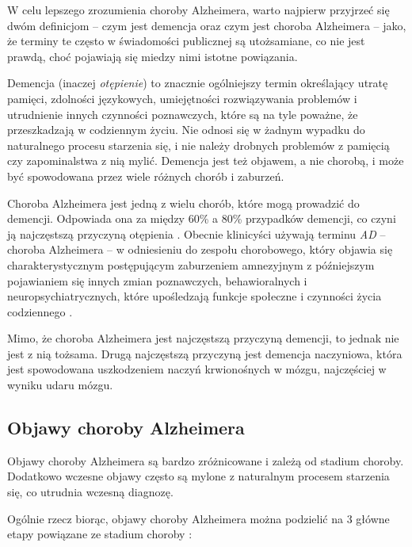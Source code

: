 W celu lepszego zrozumienia choroby Alzheimera, warto najpierw przyjrzeć się dwóm definicjom -- czym jest demencja oraz czym jest choroba Alzheimera -- jako, że terminy te często w świadomości publicznej są utożsamiane, co nie jest prawdą, choć pojawiają się miedzy nimi istotne powiązania.

Demencja (inaczej \emph{otępienie}) to znacznie ogólniejszy termin określający utratę pamięci, zdolności językowych, umiejętności rozwiązywania problemów i utrudnienie innych czynności poznawczych, które są na tyle poważne, że przeszkadzają w codziennym życiu.
Nie odnosi się w żadnym wypadku do naturalnego procesu starzenia się, i nie należy drobnych problemów z pamięcią czy zapominalstwa z nią mylić.
Demencja jest też objawem, a nie chorobą, i może być spowodowana przez wiele różnych chorób i zaburzeń.

Choroba Alzheimera jest jedną z wielu chorób, które mogą prowadzić do demencji.
Odpowiada ona za między 60\% a 80\% przypadków demencji, co czyni ją najczęstszą przyczyną otępienia \cite{what-is-alzheimers:2023}.
Obecnie klinicyści używają terminu \emph{AD} -- choroba Alzheimera -- w odniesieniu do zespołu chorobowego, który objawia się charakterystycznym postępującym zaburzeniem amnezyjnym z późniejszym pojawianiem się innych zmian poznawczych, behawioralnych i neuropsychiatrycznych, które upośledzają funkcje społeczne i czynności życia codziennego \cite{cummings2004alzheimer}.

Mimo, że choroba Alzheimera jest najczęstszą przyczyną demencji, to jednak nie jest z nią tożsama.
Drugą najczęstszą przyczyną jest demencja naczyniowa, która jest spowodowana uszkodzeniem naczyń krwionośnych w mózgu, najczęściej w wyniku udaru mózgu.


\subsection{Objawy choroby Alzheimera}

Objawy choroby Alzheimera są bardzo zróżnicowane i zależą od stadium choroby.
Dodatkowo wczesne objawy często są mylone z naturalnym procesem starzenia się, co utrudnia wczesną diagnozę.

Ogólnie rzecz biorąc, objawy choroby Alzheimera można podzielić na 3 główne etapy powiązane ze stadium choroby \cite{alzheimers-symptoms:2021}:

